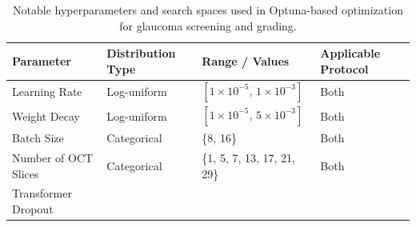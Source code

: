 \documentclass[preprint,12pt]{elsarticle}
\begin{document}
\begin{table}[!t]
    \centering
    \caption{Notable hyperparameters and search spaces used in Optuna-based optimization for glaucoma screening and grading.}
    \label{tab:hyperparameters}
    \scriptsize
    \setlength{\tabcolsep}{6pt}
    \begin{tabular}{|p{}|p{}|p{}|p{}|}
        \hline
        \textbf{Parameter}                                                       & \textbf{Distribution Type} & \textbf{Range / Values} & \textbf{Applicable Protocol} \\
        \hline
        Learning Rate                                                            &
        Log-uniform                                                              &
        $[1\times10^{-5},\,1\times10^{-3}]$                                      &
        Both                                                                                                                                                           \\
        \hline
        Weight Decay                                                             &
        Log-uniform                                                              &
        $[1\times10^{-5},\,5\times10^{-3}]$                                      &
        Both                                                                                                                                                           \\
        \hline
        Batch Size                                                               &
        Categorical                                                              &
        \{8, 16\}                                                                &
        Both                                                                                                                                                           \\
        \hline
        Number of OCT Slices                                                     &
        Categorical                                                              &
        \{1, 5, 7, 13, 17, 21, 29\}                                              &
        Both                                                                                                                                                           \\
        \hline
        Transformer Dropout                                                      &

\end{tabular}
\end{table}
\end{document}
